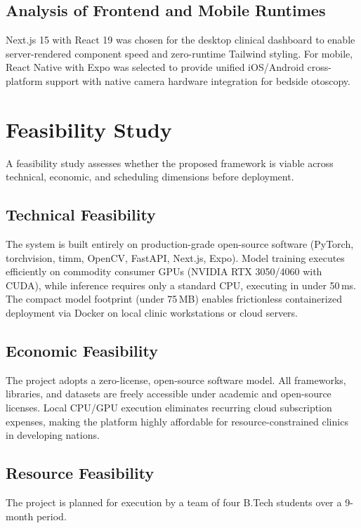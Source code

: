 \documentclass[12pt,a4paper]{report}
\begin{document}
\section{Analysis of Frontend and Mobile Runtimes}
Next.js 15 with React 19 was chosen for the desktop clinical dashboard to enable server-rendered component speed and zero-runtime Tailwind styling. For mobile, React Native with Expo was selected to provide unified iOS/Android cross-platform support with native camera hardware integration for bedside otoscopy.


\chapter{Feasibility Study}

A feasibility study assesses whether the proposed framework is viable across technical, economic, and scheduling dimensions before deployment.

\section{Technical Feasibility}
The system is built entirely on production-grade open-source software (PyTorch, torchvision, timm, OpenCV, FastAPI, Next.js, Expo). Model training executes efficiently on commodity consumer GPUs (NVIDIA RTX 3050/4060 with CUDA), while inference requires only a standard CPU, executing in under 50\,ms. The compact model footprint (under 75\,MB) enables frictionless containerized deployment via Docker on local clinic workstations or cloud servers.

\section{Economic Feasibility}
The project adopts a zero-license, open-source software model. All frameworks, libraries, and datasets are freely accessible under academic and open-source licenses. Local CPU/GPU execution eliminates recurring cloud subscription expenses, making the platform highly affordable for resource-constrained clinics in developing nations.

\section{Resource Feasibility}
The project is planned for execution by a team of four B.Tech students over a 9-month period.
\end{document}
